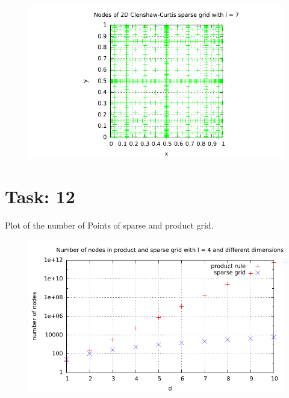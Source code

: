 \documentclass{article}
\begin{document}
\begin{figure}[htbp]
  \centering
     \includegraphics[width=1.0\textwidth]{../Task11/sh3_task11_point_plot_clenshawCurtis_l=7.pdf}
\end{figure}

\newpage
\section*{Task: 12}
Plot of the number of Points of sparse and product grid.
\begin{figure}[htbp]
  \centering
     \includegraphics[width=1.0\textwidth]{../Task12/sh3_task12_num_of_nodes.pdf}
\end{figure}
\end{document}
